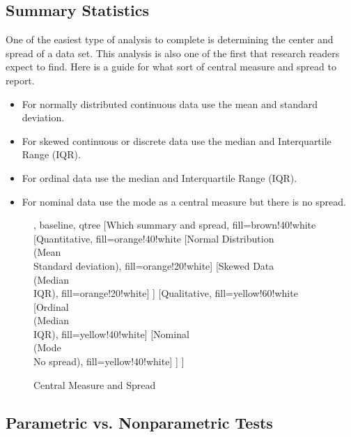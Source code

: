 \subsection{Summary Statistics}

One of the easiest type of analysis to complete is determining the center and spread of a data set. This analysis is also one of the first that research readers expect to find. Here is a guide for what sort of central measure and spread to report.

\begin{itemize}
	\item For normally distributed continuous data use the mean and standard deviation.
	\item For skewed continuous or discrete data use the median and Interquartile Range (IQR).
	\item For ordinal data use the median and Interquartile Range (IQR).
	\item For nominal data use the mode as a central measure but there is no spread.
\end{itemize}

\begin{figure}[H]
	\centering
	
	
	\begin{forest}, baseline, qtree
		[Which summary and spread, fill=brown!40!white
			[{Quantitative}, fill=orange!40!white
				[{Normal Distribution\\(Mean\\Standard deviation)}, fill=orange!20!white]
				[{Skewed Data\\(Median\\IQR)}, fill=orange!20!white]
			]
			[{Qualitative}, fill=yellow!60!white
				[{Ordinal\\(Median\\IQR)}, fill=yellow!40!white]
				[{Nominal\\(Mode\\No spread)}, fill=yellow!40!white]
			]
		]
	\end{forest}
	
	\caption{Central Measure and Spread}
	\label{fig06.09}
\end{figure}

\subsection{Parametric vs. Nonparametric Tests}

